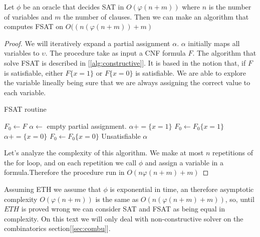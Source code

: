   \begin{proposition}
    Let $\phi$ be an oracle that decides SAT in $O(\varphi(n+m))$ where $n$ is the number of variables and $m$ the number of clauses. Then we can make an algorithm  that computes FSAT on $O((n(\varphi(n+m))+m)$ 
  \end{proposition}
  \begin{proof}
    We will iteratively expand a partial assignment $\alpha$. $\alpha$ initially maps all variables to $\upsilon$. The procedure take as input a CNF formula $F$. The algorithm that solve FSAT is described in [\ref{alg:constructive}]. It is based in the notion that, if  $F$ is satisfiable, either $F\{x=1\}$ or $F\{x=0\}$ is satisfiable. We are able to explore the variable lineally being sure that we are always assigning the correct value to each variable. 

    
    \begin{algorithm}
  \caption{FSAT routine}\label{alg:constructive}
  \begin{algorithmic}[1]

    
  \State $F_0 \gets F$
  \State $\alpha \gets$ empty partial assignment.
  \State
    \State $\alpha += \{x = 1\}$
    \State $F_0 \gets F_0\{x=1\}$
    \Else {} 
    \State $\alpha += \{x = 0\}$
    \State $F_0 \gets F_0\{x=0\}$
    \Else
    \State \Return Unsatisfiable
    \EndIf
    \EndIf
    \EndFor
    \State \Return $\alpha$
  \end{algorithmic}
\end{algorithm}

Let's analyze the complexity of this algorithm. We make at most $n$ repetitions of the for loop, and on each repetition we call $\phi$ and assign a variable in a formula.Therefore the procedure run in $O(n\varphi(n+m)+m)$
\end{proof}

Assuming ETH we assume that $\phi$ is exponential in time, an therefore asymptotic complexity $O(\varphi(n+m))$ is the same as $O(n(\varphi(n+m)+m))$, so, until $ETH$ is proved wrong we can consider SAT and FSAT as being equal in complexity. On this text we will only deal with non-constructive  solver on the combinatorics section[\ref{sec:combu}].



